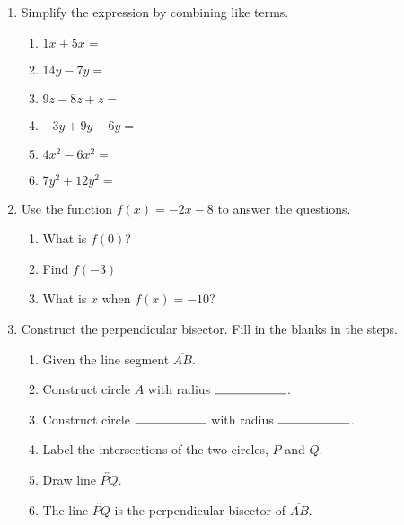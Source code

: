 \documentclass[12pt, twoside]{article}
\begin{document}
\begin{enumerate}[itemsep=0.5cm]
\item Simplify the expression by combining like terms.
    \begin{multicols}{2}
    \begin{enumerate}[itemsep=0.5cm]
        \item $1x + 5x =$
        \item $14y - 7y =$
        \item $9z - 8z + z =$
        \item $-3y + 9y - 6y =$
        \item $4x^2 - 6x^2 =$
        \item $7y^2 + 12y^2 =$
    \end{enumerate}
    \end{multicols}

\newpage
\item Use the function $f(x) = -2x-8$ to answer the questions.
\begin{multicols}{2}
\begin{enumerate}[itemsep=1cm]
    \item What is $f(0)$?
    \item Find $f(-3)$
    \item What is $x$ when $f(x) = -10$?
\end{enumerate}
\end{multicols} \vspace{1cm}

\item Construct the perpendicular bisector. Fill in the blanks in the steps.
\begin{enumerate}
  \item Given the line segment $\overline{AB}$.
  \bigskip
  \item Construct circle $A$ with radius $\rule{2cm}{0.15mm}$.
  \bigskip
  \item Construct circle $\rule{2cm}{0.15mm}$  with radius $\rule{2cm}{0.15mm}$.
  \item Label the intersections of the two circles, $P$ and $Q$.
  \item Draw line $\overleftrightarrow{PQ}$.
  \item The line $\overleftrightarrow{PQ}$ is the perpendicular bisector of $\overline{AB}$.
\end{enumerate}
\vspace{5cm}
\begin{center}
\end{center}

\end{enumerate}
\end{document}

